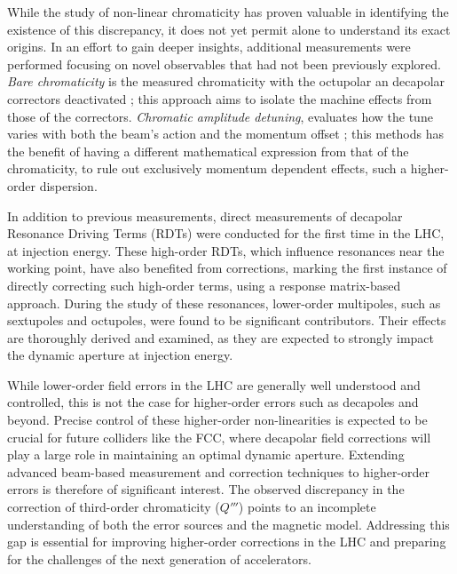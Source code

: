 While the study of non-linear chromaticity has proven valuable in identifying the existence of this
discrepancy, it does not yet permit alone to understand its exact origins. In an effort to gain
deeper insights, additional measurements were performed focusing on novel observables that had not
been previously explored.
\textit{Bare chromaticity} is the measured chromaticity with
the octupolar an decapolar correctors deactivated ; this approach aims to isolate the machine
effects from those of the correctors.
\textit{Chromatic amplitude detuning}, evaluates how the tune varies with both the beam's action and
the momentum offset ; this methods has the benefit of having a different mathematical expression
from that of the chromaticity, to rule out exclusively momentum dependent effects, such a
higher-order dispersion.

In addition to previous measurements, direct measurements of decapolar Resonance Driving Terms
(RDTs) were conducted for the first time in the LHC, at injection energy. These high-order RDTs,
which influence resonances near the working point, have also benefited from corrections, marking the
first instance of directly correcting such high-order terms, using a response matrix-based approach.
During the study of these resonances, lower-order multipoles, such as sextupoles and octupoles, were
found to be significant contributors. Their effects are thoroughly derived and examined, as they are
expected to strongly impact the dynamic aperture at injection energy.

While lower-order field errors in the LHC are generally well understood and controlled, this is not
the case for higher-order errors such as decapoles and beyond. Precise control of these higher-order
non-linearities is expected to be crucial for future colliders like the FCC, where decapolar field
corrections will play a large role in maintaining an optimal dynamic aperture. Extending advanced
beam-based measurement and correction techniques to higher-order errors is therefore of significant
interest.
The observed discrepancy in the correction of third-order chromaticity ($Q'''$) points to an
incomplete understanding of both the error sources and the magnetic model. Addressing this gap is
essential for improving higher-order corrections in the LHC and preparing for the challenges of the
next generation of accelerators.

